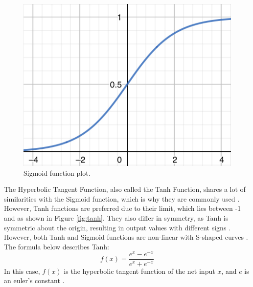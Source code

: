 \documentclass[12pt]{diazessay}
\newcounter{subsubsubsection}[subsubsection]
\begin{document}
    \newpage
    \begin{figure}[htp]
        \centering
        \includegraphics[scale=0.23]{Figures/Sigmoid.jpeg}
        \caption[Sigmoid function plot]{Sigmoid function plot.}
        \label{fig:sigmoid}
    \end{figure}
    
      \hspace{0.7cm}  The Hyperbolic Tangent Function, also called the Tanh Function, shares a lot of similarities with the Sigmoid function, which is why they are commonly used \cite{sharma2017activation}.
      However, Tanh functions are preferred due to their limit, which lies between -1 and as shown in Figure \ref{fig:tanh}. They also differ in symmetry, as Tanh is symmetric about the origin, resulting in output values with different signs
      \cite{sharma2017activation}\cite{shakiba2020novel}. However, both Tanh and Sigmoid functions are non-linear with S-shaped curves \cite{shamsi2015hyperbolic}. The formula below describes Tanh:
    \begin{equation*}
        f(x) = \frac { e^{x} - e^{-x} } { e^{x} + e^{-x} } 
    \end{equation*} In this case, $f(x)$ is the hyperbolic tangent function of the net input $x$, and $e$ is an euler's constant \cite{shakiba2020novel}.
    
\end{document}
